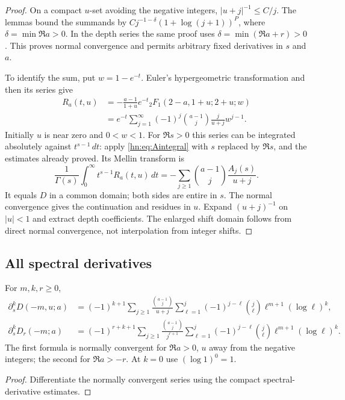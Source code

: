 \begin{proof}
On a compact $u$-set avoiding the negative integers,
$|u+j|^{-1}\le C/j$. The lemmas bound the summands by
$Cj^{-1-\delta}(1+\log(j+1))^P$, where
$\delta=\min\Re a>0$. In the depth series the same proof uses
$\delta=\min(\Re a+r)>0$. This proves normal convergence and
permits arbitrary fixed derivatives in $s$ and $a$.

To identify the sum, put $w=1-e^{-t}$. Euler's hypergeometric
transformation \cite{DLMFHypergeom} and then its series give
\begin{align*}
 R_a(t,u)
 &=-\frac{a-1}{1+u}e^{-t}
       {}_2F_1(2-a,1+u;2+u;w)\\
 &=e^{-t}\sum_{j=1}^\infty
        (-1)^j\binom{a-1}{j}\frac{j}{u+j}w^{j-1}.
\end{align*}
Initially $u$ is near zero and $0<w<1$. For $\Re s>0$ this
series can be integrated absolutely against $t^{s-1}\,dt$:
apply \eqref{hn:eq:Aintegral} with $s$ replaced by $\Re s$,
and the estimates already proved. Its Mellin transform is
\[
 \frac1{\Gamma(s)}\int_0^\infty t^{s-1}R_a(t,u)\,dt
 =-\sum_{j\ge1}\binom{a-1}{j}\frac{A_j(s)}{u+j}.
\]
It equals $D$ in a common domain; both sides are entire in $s$.
The normal convergence gives the continuation and residues in $u$.
Expand $(u+j)^{-1}$ on $|u|<1$ and extract depth coefficients.
The enlarged shift domain follows from direct normal convergence,
not interpolation from integer shifts.
\end{proof}

\subsection{All spectral derivatives}

\begin{corollary}\label{hn:cor:jets}
For $m,k,r\ge0$,
\begin{align}
 \partial_s^kD(-m,u;a)
 &=(-1)^{k+1}\sum_{j\ge1}\frac{\binom{a-1}{j}}{u+j}
       \sum_{\ell=1}^j(-1)^{j-\ell}\binom j\ell
                     \ell^{m+1}(\log\ell)^k,
 \label{hn:eq:spectral-full}\\
 \partial_s^kD_r(-m;a)
 &=(-1)^{r+k+1}\sum_{j\ge1}\frac{\binom{a-1}{j}}{j^{r+1}}
       \sum_{\ell=1}^j(-1)^{j-\ell}\binom j\ell
                     \ell^{m+1}(\log\ell)^k.
 \label{hn:eq:spectral-depth}
\end{align}
The first formula is normally convergent for $\Re a>0$, $u$ away
from the negative integers; the second for $\Re a>-r$.
At $k=0$ use $(\log1)^0=1$.
\end{corollary}
\begin{proof}
Differentiate the normally convergent series using the compact
spectral-derivative estimates.
\end{proof}

